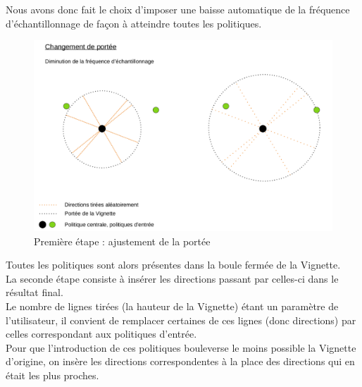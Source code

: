 \documentclass[12pt]{article}
\begin{document}
Nous avons donc fait le choix d'imposer une baisse automatique de la fréquence d'échantillonnage de façon à atteindre toutes les politiques. \\

\begin{figure}[htp]
    \centering
    \includegraphics[width=15cm]{Images/vignette_portee}
    \caption{Première étape : ajustement de la portée}
    \label{fig:vignettePortee}
\end{figure}

Toutes les politiques sont alors présentes dans la boule fermée de la Vignette. \\

\newpage
La seconde étape consiste à insérer les directions passant par celles-ci dans le résultat final. \\

Le nombre de lignes tirées (la hauteur de la Vignette) étant un paramètre de l'utilisateur, il convient de remplacer certaines de ces lignes (donc directions) par celles correspondant aux politiques d'entrée. \\

Pour que l'introduction de ces politiques bouleverse le moins possible la Vignette d'origine, on insère les directions correspondentes à la place des directions qui en était les plus proches. \\
\end{document}
